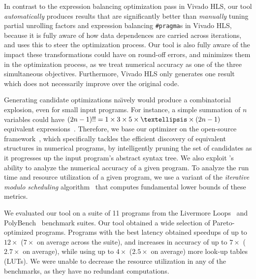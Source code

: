 In contrast to the expression balancing optimization pass in Vivado HLS,
our tool \emph{automatically} produces results that are significantly
better than \emph{manually} tuning partial unrolling factors and expression
balancing \verb|#pragma|s in Vivado HLS, because it is fully aware of how
data dependences are carried across iterations, and uses this to steer the
optimization process.  Our tool is also fully aware of the impact these
transformations could have on round-off errors, and minimizes them in the
optimization process, as we treat numerical accuracy as one of the three
simultaneous objectives.  Furthermore, Vivado HLS only generates one result
which does not necessarily improve over the original code.

Generating candidate optimizations na{\"\i}vely would produce a combinatorial
explosion, even for small input programs.  For instance, a simple summation of
$n$ variables could have $(2n - 1)!! = 1 \times 3 \times 5 \times \textellipsis
\times (2n - 1)$ equivalent expressions~\cite{mouilleron}.  Therefore, we
base our optimizer on the open-source \SOAP{} framework~\cite{soap2}, which
specifically tackles the efficient discovery of equivalent structures in
numerical programs, by intelligently pruning the set of candidates as it
progresses up the input program's abstract syntax tree.  We also exploit
\SOAP{}'s ability to analyze the numerical accuracy of a given program.  To
analyze the run time and resource utilization of a given program, we use a
variant of the \emph{iterative modulo scheduling} algorithm~\cite{rau94} that
computes fundamental lower bounds of these metrics.

We evaluated our tool on a suite of 11 programs from the Livermore
Loops~\cite{livermore} and PolyBench~\cite{polybench} benchmark suites.  Our
tool obtained a wide selection of Pareto-optimized programs.  Programs with
the best latency obtained speedups of up to $12\times$ ($7\times$ on average
across the suite), and increases in accuracy of up to $7\times$ ($2.7\times$
on average), while using up to $4\times$ ($2.5\times$ on average) more look-up
tables (LUTs).  We were unable to decrease the resource utilization in any of
the benchmarks, as they have no redundant computations.

